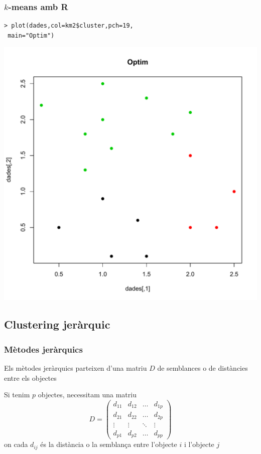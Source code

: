 \documentclass[12pt,t]{beamer}
\theoremstyle{plain}
\theoremstyle{definition}
\begin{document}
\begin{frame}[fragile]
\frametitle{$k$-means amb R}

\begin{verbatim}
> plot(dades,col=km2$cluster,pch=19,
 main="Optim")
\end{verbatim}
\vspace*{-3ex}

\begin{center}
\includegraphics[width=0.7 \linewidth]{Rplot52.pdf}
\end{center}

\end{frame}


%
% 
%
%


\subsection{Clustering jeràrquic}

\begin{frame}
\frametitle{Mètodes jeràrquics}

Els mètodes jeràrquics parteixen d'una matriu $D$ de semblances o de  distàncies entre els objectes
\medskip

Si tenim $p$ objectes, necessitam una matriu
$$
D=\left(\begin{array}{cccc}
d_{11} & d_{12} & \ldots & d_{1p}\\
d_{21} & d_{22} & \ldots & d_{2p}\\
\vdots & \vdots & \ddots & \vdots\\
d_{p1} & d_{p2} & \ldots & d_{pp}
\end{array}
\right)
$$
on cada $d_{ij}$ és la distància o la semblança entre l'objecte $i$ i l'objecte $j$
\end{frame}
\end{document}

